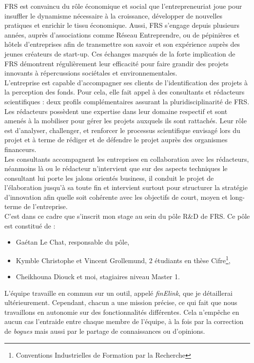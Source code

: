 FRS est convaincu du rôle économique et social que l'entrepreneuriat joue pour insuffler le dynamisme nécessaire à la croissance, développer de nouvelles pratiques et enrichir le tissu économique. Aussi, FRS s'engage depuis plusieurs années, auprès d'associations comme Réseau Entreprendre, ou de pépinières et hôtels d'entreprises afin de transmettre son savoir et son expérience auprès des jeunes créateurs de start-up. Ces échanges marqués de la forte implication de FRS démontrent régulièrement leur efficacité pour faire grandir des projets innovants à répercussions sociétales et environnementales.\\
L'entreprise est capable d'accompagner ses clients de l'identification des projets à la perception des fonds. Pour cela, elle fait appel à des consultants et rédacteurs scientifiques : deux profils complémentaires assurant la pluridisciplinarité de FRS.\\
Les rédacteurs possèdent une expertise dans leur domaine respectif et sont amenés à la mobiliser pour gérer les projets auxquels ils sont rattachés. Leur rôle est d'analyser, challenger, et renforcer le processus scientifique envisagé lors du projet et à terme de rédiger et de défendre le projet auprès des organismes financeurs.\\

Les consultants accompagnent les entreprises en collaboration avec les rédacteurs, néanmoins là ou le rédacteur n'intervient que sur des aspects techniques le consultant lui porte les jalons orientés business, il conduit le projet de l'élaboration jusqu'à sa toute fin et intervient surtout pour structurer la stratégie d'innovation afin quelle soit cohérente avec les objectifs de court, moyen et long-terme de l'entreprise.\\

C'est dans ce cadre que s'inscrit mon stage au sein du pôle R\&D de FRS. Ce pôle est constitué de :
\begin{itemize}
\item Gaétan Le Chat, responsable du pôle,
\item Kymble Christophe et Vincent Grollemund, 2 étudiants en thèse Cifre\footnote{Conventions Industrielles de Formation par la Recherche},
\item Cheikhouna Diouck et moi, stagiaires niveau Master 1.
\end{itemize}
L'équipe travaille en commun sur un outil, appelé \textit{finElink}, que je détaillerai ultérieurement. Cependant, chacun a une mission précise, ce qui fait que nous travaillons en autonomie sur des fonctionnalités différentes. Cela n'empêche en aucun cas l'entraide entre chaque membre de l'équipe, à la fois par la correction de \textit{bogues} mais aussi par le partage de connaissances ou d'opinions.